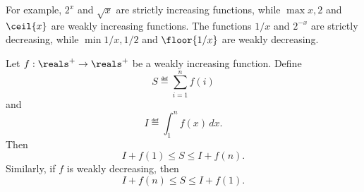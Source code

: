 For example, $2^x$ and $\sqrt{x}$ are strictly increasing functions,
while $\max{x,2}$ and $\ceil{x}$ are weakly increasing functions.  The
functions $1/x$ and $2^{-x}$ are strictly decreasing, while $\min{1/x,
  1/2}$ and $\floor{1/x}$ are weakly decreasing.

\begin{theorem}\label{weak_increasing_sum_bounds}  %
Let $f: \reals^+ \to \reals^+$ be a weakly increasing function.
Define
\begin{equation}\label{Sdefsumf}
    S \eqdef \sum_{i = 1}^n f(i)
\end{equation}
and
\[
    I \eqdef \int_1^n f(x)\, dx.
\]
Then
\begin{equation}\label{If1lS}
    I + f(1) \le S \le I + f(n).
\end{equation}
Similarly, if $f$ is weakly decreasing, then
\[
    I + f(n) \le S \le I + f(1).
\]
\end{theorem}

